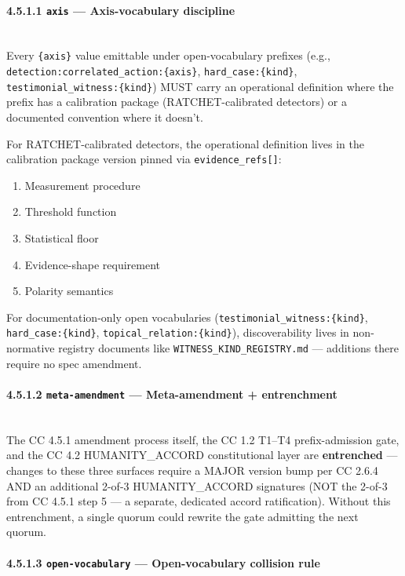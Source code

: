 \documentclass[11pt]{article}
\begin{document}
\paragraph{4.5.1.1 \texttt{axis} — Axis-vocabulary discipline}\mbox{}\\


Every \texttt{\{axis\}} value emittable under open-vocabulary prefixes (e.g., \texttt{detection:correlated\_action:\{axis\}}, \texttt{hard\_case:\{kind\}}, \texttt{testimonial\_witness:\{kind\}}) MUST carry an operational definition where the prefix has a calibration package (RATCHET-calibrated detectors) or a documented convention where it doesn't.


For RATCHET-calibrated detectors, the operational definition lives in the calibration package version pinned via \texttt{evidence\_refs[]}:


\begin{enumerate}\setlength\itemsep{0pt}
\item Measurement procedure
\item Threshold function
\item Statistical floor
\item Evidence-shape requirement
\item Polarity semantics
\end{enumerate}


For documentation-only open vocabularies (\texttt{testimonial\_witness:\{kind\}}, \texttt{hard\_case:\{kind\}}, \texttt{topical\_relation:\{kind\}}), discoverability lives in non-normative registry documents like \texttt{WITNESS\_KIND\_REGISTRY.md} — additions there require no spec amendment.


\paragraph{4.5.1.2 \texttt{meta-amendment} — Meta-amendment + entrenchment}\mbox{}\\


The CC 4.5.1 amendment process itself, the CC 1.2 T1–T4 prefix-admission gate, and the CC 4.2 HUMANITY\_ACCORD constitutional layer are \textbf{entrenched} — changes to these three surfaces require a MAJOR version bump per CC 2.6.4 AND an additional 2-of-3 HUMANITY\_ACCORD signatures (NOT the 2-of-3 from CC 4.5.1 step 5 — a separate, dedicated accord ratification). Without this entrenchment, a single quorum could rewrite the gate admitting the next quorum.


\paragraph{4.5.1.3 \texttt{open-vocabulary} — Open-vocabulary collision rule}\mbox{}\\
\end{document}
